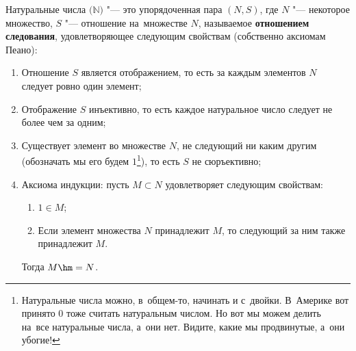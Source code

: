 
    Натуральные числа $\big(\mathbb{N}\big)$ "--- это упорядоченная пара $(N,S)$, где $N$ "--- некоторое множество, $S$ "--- отношение
     на~множестве $N$, называемое \textbf{отношением следования}, удовлетворяющее следующим свойствам (собственно аксиомам Пеано):

    \begin{enumerate}
        \item Отношение $S$ является отображением, то есть за каждым элементов $N$ следует ровно один элемент;

        \item Отображение $S$ инъективно, то есть каждое натуральное число следует не более чем за одним;

        \item Существует элемент во множестве $N$, не следующий ни каким другим (обозначать мы его будем
            $1$\footnote{Натуральные числа можно, в~общем-то, начинать и с~двойки. 
            В~Америке вот принято $0$ тоже считать натуральным числом. 
            Но вот мы можем делить на~все натуральные числа, а~они нет. 
            Видите, какие мы продвинутые, а~они убогие!}), то есть $S$ не сюръективно;



        \item\label{Induct} Аксиома индукции: пусть $M\subset N$ удовлетворяет следующим свойствам:
            \begin{enumerate}
                \item $1\in M$;
                \item Если элемент множества $N$ принадлежит $M$, то следующий за ним также принадлежит $M$.
            \end{enumerate}
            Тогда $M\hm=N$.
    \end{enumerate}
